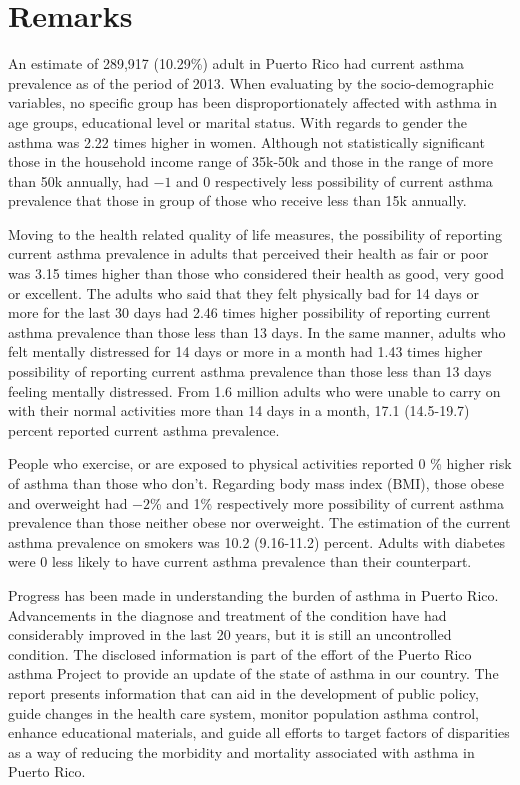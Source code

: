  \section{Remarks}

An estimate of 289,917 
(10.29\%) adult in Puerto Rico had current asthma prevalence as of the period of 2013.
When evaluating by the socio-demographic variables, no specific group has been disproportionately affected with asthma in age groups, educational level or marital status. With regards to gender the asthma was 2.22 times higher in women. Although not statistically significant those in the household income range of 35k-50k and those in the range of more than 50k annually, had \ensuremath{-1} and 0 respectively less possibility of current asthma prevalence that those  in group of those who receive less than 15k annually.

Moving to the health related quality of life measures, the possibility of reporting current asthma prevalence in adults that perceived their health as fair or poor was 3.15 times higher than those who considered their health as good, very good or excellent. The adults who said that they felt physically bad for 14 days or more for the last 30 days had 2.46 times higher possibility of reporting current asthma prevalence than those less than 13 days. In the same manner, adults who felt mentally distressed for 14 days or more in a month had 1.43 times higher possibility of reporting current asthma prevalence than those less than 13 days feeling mentally distressed. From 1.6 million adults who were unable to carry on with their normal activities more than 14 days in a month, 17.1 (14.5-19.7) percent reported current asthma prevalence. 

People who exercise, or are exposed to physical activities reported 0 \% higher risk of asthma than those who don't.  Regarding body mass index (BMI), those obese and overweight had \ensuremath{-2}\% and 1\% respectively more possibility of current asthma prevalence than those neither obese nor overweight. The estimation of the current asthma prevalence on smokers was 10.2 (9.16-11.2) percent.  Adults with diabetes were 0\5 less likely to have current asthma prevalence than their counterpart.



Progress has been made in understanding the burden of asthma in Puerto Rico. Advancements in the diagnose and treatment of the condition have had considerably improved in the last 20 years, but it is still an uncontrolled condition. The disclosed information is part of the effort of the Puerto Rico asthma Project to provide an update of the state of asthma in our country. The report presents information that can aid in the development of public policy, guide changes in the health care system, monitor population asthma control, enhance educational materials, and guide all efforts to target factors of disparities as a way of reducing the morbidity and mortality associated with asthma in Puerto Rico.

